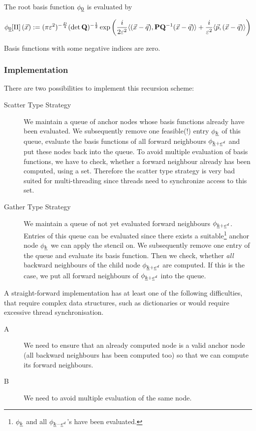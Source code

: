 \documentclass{article}
\begin{document}
The root basis function \(\phi_{\underline{0}}\) is evaluated by

\begin{equation}
  \label{eq:phi0_Dd}
  \phi_{\underline{0}}[\Pi]\left(\vec{x}\right)
  :=
  (\pi\varepsilon^2)^{-\frac{D}{4}} (\det\mathbf{Q})^{-\frac{1}{2}}
  \exp \left( \frac{i}{2\varepsilon^2}
    \langle (\vec{x}-\vec{q}) , \mathbf{P}\mathbf{Q}^\mathrm{-1}(\vec{x}-\vec{q}) \rangle
    + \frac{i}{\varepsilon^2} \langle \vec{p} , (\vec{x}-\vec{q}) \rangle
  \right)
\end{equation}

Basis functions with some negative indices are zero.

\subsubsection{Implementation}
There are two possibilities to implement this recursion scheme:
\begin{description}
\item[Scatter Type Strategy] We maintain a queue of anchor nodes whose
  basis functions already have been evaluated.
  We subsequently remove one feasible(!) entry \(\phi_{\underline{k}}\) of this queue,
  evaluate the basis functions of all forward
  neighbours \(\phi_{\underline{k}+\underline{e}^d}\) and put these nodes back into the
  queue. To avoid multiple evaluation of basis functions, we
  have to check, whether a forward neighbour already has been computed,
  using a set. Therefore the scatter type strategy is very bad suited
  for multi-threading since threads need to synchronize access to this
  set.
\item[Gather Type Strategy] We maintain a queue of not yet evaluated
  forward neighbours \(\phi_{\underline{k}+\underline{e}^d}\). Entries of this queue can be evaluated
  since there exists a suitable\footnote{\(\phi_{\underline{k}}\) and all \(\phi_{\underline{k}-\underline{e}^d}\)'s
  have been evaluated.}
  anchor node \(\phi_{\underline{k}}\) we can apply the stencil on.
  We subsequently remove one entry of the queue and evaluate its basis function.
  Then we check, whether \emph{all} backward neighbours of the child
  node \(\phi_{\underline{k}+\underline{e}^d}\) are computed. If this is the case, we put all forward neighbours
  of \(\phi_{\underline{k}+\underline{e}^d}\) into the queue.
\end{description}

A straight-forward implementation has at least one of the following
difficulties, that require complex data structures, such as dictionaries
or would require excessive thread synchronisation.
\begin{description}
\item[A] We need to ensure that an already computed node is a valid
  anchor node (all backward neighbours has been computed too) so that
  we can compute its forward neighbours.
\item[B] We need to avoid multiple evaluation of the same node.
\end{description}
\end{document}
